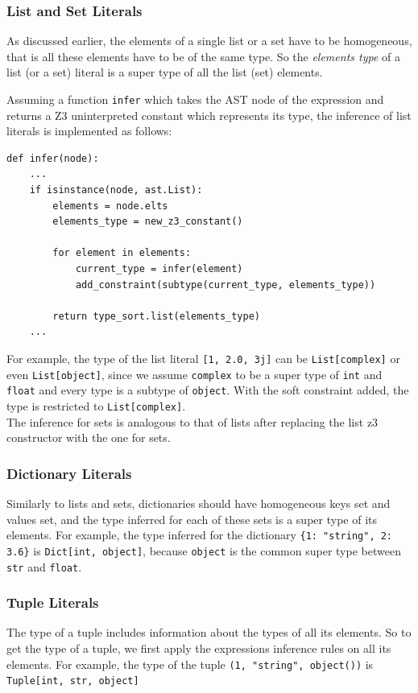 \subsubsection{List and Set Literals}
As discussed earlier, the elements of a single list or a set have to be homogeneous, that is all these elements have to be of the same type. So the \textit{elements type} of a list (or a set) literal is a super type of all the list (set) elements.

Assuming a function \lstinline|infer| which takes the AST node of the expression and returns a Z3 uninterpreted constant which represents its type, the inference of list literals is implemented as follows:

\begin{lstlisting}
def infer(node):
	...
	if isinstance(node, ast.List):
		elements = node.elts
		elements_type = new_z3_constant()
		
		for element in elements:
			current_type = infer(element)
			add_constraint(subtype(current_type, elements_type))
			
		return type_sort.list(elements_type)
	...
\end{lstlisting}

For example, the type of the list literal \lstinline|[1, 2.0, 3j]| can be \lstinline|List[complex]| or even \lstinline|List[object]|, since we assume \lstinline|complex| to be a super type of \lstinline|int| and \lstinline|float| and every type is a subtype of \lstinline|object|. With the soft constraint added, the type is restricted to \lstinline|List[complex]|.\\

The inference for sets is analogous to that of lists after replacing the list z3 constructor with the one for sets.


\subsubsection{Dictionary Literals}
Similarly to lists and sets, dictionaries should have homogeneous keys set and values set, and the type inferred for each of these sets is a super type of its elements. For example, the type inferred for the dictionary \lstinline|{1: "string", 2: 3.6}| is \lstinline|Dict[int, object]|, because \lstinline|object| is the common super type between \lstinline|str| and \lstinline|float|.


\subsubsection{Tuple Literals}
The type of a tuple includes information about the types of all its elements. So to get the type of a tuple, we first apply the expressions inference rules on all its elements. For example, the type of the tuple \lstinline|(1, "string", object())| is \lstinline|Tuple[int, str, object]|

